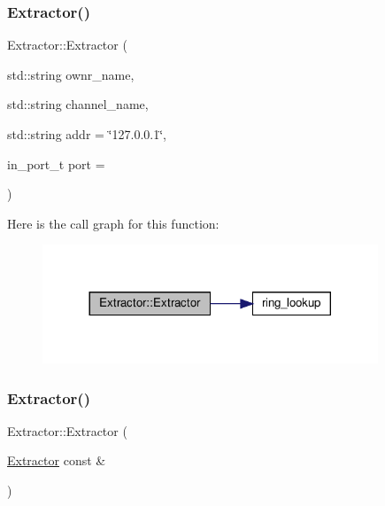 \subsubsection{\texorpdfstring{Extractor()}{Extractor()}\hspace{0.1cm}{\footnotesize\ttfamily [1/3]}}
{\footnotesize\ttfamily Extractor\+::\+Extractor (\begin{DoxyParamCaption}\item[{std\+::string}]{ownr\+\_\+name,  }\item[{std\+::string}]{channel\+\_\+name,  }\item[{std\+::string}]{addr = {\ttfamily \char`\"{}127.0.0.1\char`\"{}},  }\item[{in\+\_\+port\+\_\+t}]{port = {} }\end{DoxyParamCaption})}

Here is the call graph for this function\+:
\nopagebreak
\begin{figure}[H]
\begin{center}
\leavevmode
\includegraphics[width=284pt]{classExtractor_aaefc9c7f9b152b6380cb65c1e36ac95b_cgraph}
\end{center}
\end{figure}
\mbox{\label{classExtractor_af0ccf57906e47cef731d7476956aca03}} 
\subsubsection{\texorpdfstring{Extractor()}{Extractor()}\hspace{0.1cm}{\footnotesize\ttfamily [2/3]}}
{\footnotesize\ttfamily Extractor\+::\+Extractor (\begin{DoxyParamCaption}\item[{\hyperlink{classExtractor}{Extractor} const \&}]{ }\end{DoxyParamCaption})\hspace{0.3cm}{\ttfamily [delete]}}

\mbox{\label{classExtractor_ae3a09acb7a8e25f72b7cfc829f8aed8c}} 
